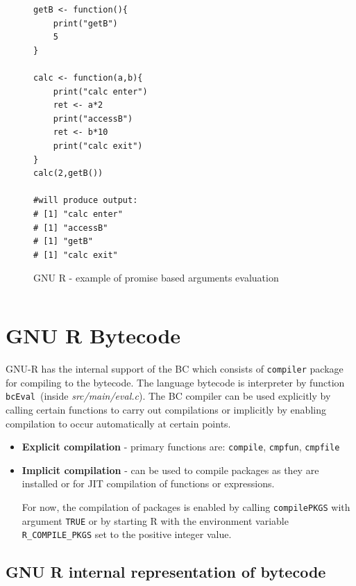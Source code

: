 \documentclass[thesis=M,english]{FITthesis}[2018/10/20]
\newcommand{\code}[1]{\texttt{#1}}
\begin{document}
\begin{figure}[!h]
\begin{lstlisting}
getB <- function(){
	print("getB")
	5
}

calc <- function(a,b){
	print("calc enter")
	ret <- a*2
	print("accessB")
	ret <- b*10
	print("calc exit")
}
calc(2,getB())

#will produce output:
# [1] "calc enter"
# [1] "accessB"
# [1] "getB"
# [1] "calc exit"
\end{lstlisting}
\caption{\label{fig:gnu-r-promise-arguments} GNU R - example of promise based arguments evaluation}
\end{figure}


\begin{lstlisting}

\end{lstlisting}


\section{GNU R Bytecode}

GNU-R has the internal support of the BC which consists of \code{compiler} package for compiling to the bytecode. The language bytecode is interpreter by function \code{bcEval}~(inside \textit{src/main/eval.c}). The BC compiler can be used explicitly by calling certain functions to carry out compilations or implicitly by enabling compilation to occur automatically at certain points.

\begin{itemize}
  \item \textbf{Explicit compilation} - primary functions are: \code{compile}, \code{cmpfun}, \code{cmpfile}
  \item \textbf{Implicit compilation} - can be used to compile packages as they are installed or for JIT compilation of functions or expressions.

For now, the compilation of packages is enabled by calling \code{compilePKGS} with argument \code{TRUE} or by starting R with the environment variable \code{R{\_}COMPILE{\_}PKGS} set to the positive integer value.
\end{itemize}


\subsection{GNU R internal representation of bytecode}\label{R-internal-bc-representation}
\end{document}

